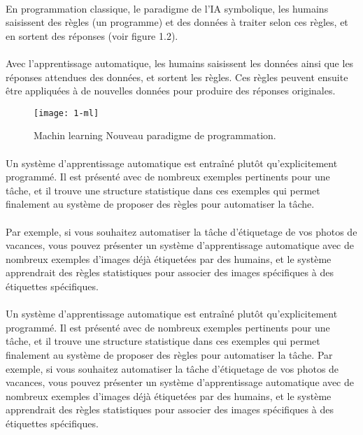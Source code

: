 \paragraph{}En programmation classique, le paradigme de l'IA symbolique, les humains saisissent des règles (un programme) et des données à traiter selon ces règles, et en sortent des réponses (voir figure 1.2).
\paragraph{}Avec l'apprentissage automatique, les humains saisissent les données ainsi que les réponses attendues des données, et sortent les règles. Ces règles peuvent ensuite être appliquées à de nouvelles données pour produire des réponses originales.

\begin{figure}[h]
    \centering
    \texttt{[image: 1-ml]}
    \caption{Machin learning Nouveau paradigme de programmation.}
    \label{fig:1-ml}
\end{figure}

\paragraph{}Un système d'apprentissage automatique est entraîné plutôt qu'explicitement programmé. Il est présenté avec de nombreux exemples pertinents pour une tâche, et il trouve une structure statistique dans ces exemples qui permet finalement au système de proposer des règles pour automatiser la tâche. 
\paragraph{}Par exemple, si vous souhaitez automatiser la tâche d'étiquetage de vos photos de vacances, vous pouvez présenter un système d'apprentissage automatique avec de nombreux exemples d'images déjà étiquetées par des humains, et le système apprendrait des règles statistiques pour associer des images spécifiques à des étiquettes spécifiques.
\paragraph{}Un système d'apprentissage automatique est entraîné plutôt qu'explicitement programmé. Il est présenté avec de nombreux exemples pertinents pour une tâche, et il trouve une structure statistique dans ces exemples qui permet finalement au système de proposer des règles pour automatiser la tâche. Par exemple, si vous souhaitez automatiser la tâche d'étiquetage de vos photos de vacances, vous pouvez présenter un système d'apprentissage automatique avec de nombreux exemples d'images déjà étiquetées par des humains, et le système apprendrait des règles statistiques pour associer des images spécifiques à des étiquettes spécifiques.
